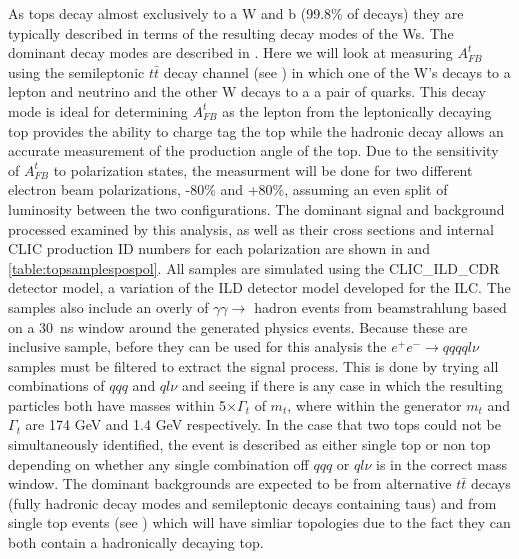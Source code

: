 As tops decay almost exclusively to a W and b (99.8\% of decays) they are typically described in terms of the resulting decay modes of the Ws. The dominant decay modes are described in . Here we will look at measuring $A_{FB}^{t}$ using the semileptonic $t\bar{t}$ decay channel (see ) in which one of the W's decays to a lepton and neutrino and the other W decays to a a pair of quarks. This decay mode is ideal for determining $A_{FB}^{t}$ as the lepton from the leptonically decaying top provides the ability to charge tag the top while the hadronic decay allows an accurate measurement of the production angle of the top. Due to the sensitivity of $A_{FB}^{t}$ to polarization states, the measurment will be done for two different electron beam polarizations, -80\% and +80\%, assuming an even split of luminosity between the two configurations. The dominant signal and background processed examined by this analysis, as well as their cross sections and internal \ac{CLIC} production ID numbers for each polarization are shown in  and \ref{table:topsamplespospol}. All samples are simulated using the CLIC\_ILD\_CDR detector model, a variation of the ILD detector model developed for the ILC. The samples also include an overly of $\gamma\gamma\rightarrow$ hadron events from beamstrahlung based on a 30~ns window around the generated physics events. Because these are inclusive sample, before they can be used for this analysis the $e^+e^-\rightarrow qqqql\nu$ samples must be filtered to extract the signal process. This is done by trying all combinations of $qqq$ and $ql\nu$ and seeing if there is any case in which the resulting particles both have masses within 5$\times\Gamma_t$ of $m_t$, where within the generator $m_t$ and $\Gamma_t$ are 174 GeV and 1.4 GeV respectively. In the case that two tops could not be simultaneously identified, the event is described as either single top or non top depending on whether any single combination off $qqq$ or $ql\nu$ is in the correct mass window. The dominant backgrounds are expected to be from alternative $t\bar{t}$ decays (fully hadronic decay modes and semileptonic decays containing taus) and from single top events (see ) which will have simliar topologies due to the fact they can both contain a hadronically decaying top.

